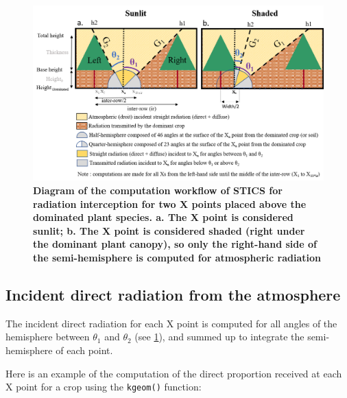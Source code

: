 \documentclass[]{book}
\theoremstyle{definition}
\theoremstyle{definition}
\theoremstyle{definition}
\theoremstyle{remark}
\begin{document}
\begin{figure}
\centering
\includegraphics{img/Light-interception-dominated.png}
\caption{\label{fig:Compdominated}\textbf{Diagram of the computation
workflow of STICS for radiation interception for two X points placed
above the dominated plant species. a. The X point is considered sunlit;
b. The X point is considered shaded (right under the dominant plant
canopy), so only the right-hand side of the semi-hemisphere is computed
for atmospheric radiation}}
\end{figure}

\subsection{Incident direct radiation from the
atmosphere}\label{incident-direct-radiation-from-the-atmosphere}

The incident direct radiation for each X point is computed for all
angles of the hemisphere between \(\theta_1\) and \(\theta_2\) (see
\ref{fig:Compdominated}), and summed up to integrate the semi-hemisphere
of each point.

Here is an example of the computation of the direct proportion received
at each X point for a crop using the \texttt{kgeom()} function:
\end{document}
